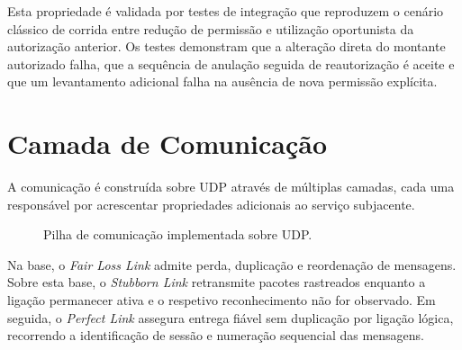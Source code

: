 \documentclass[runningheads]{llncs}
\begin{document}
Esta propriedade \'e validada por testes de integra\c{c}\~ao que reproduzem o cen\'ario cl\'assico de corrida entre redu\c{c}\~ao de permiss\~ao e utiliza\c{c}\~ao oportunista da autoriza\c{c}\~ao anterior. Os testes demonstram que a altera\c{c}\~ao direta do montante autorizado falha, que a sequ\^encia de anula\c{c}\~ao seguida de reautoriza\c{c}\~ao \'e aceite e que um levantamento adicional falha na aus\^encia de nova permiss\~ao expl\'icita.

\section{Camada de Comunica\c{c}\~ao}
\label{sec:camada-comunicacao}

A comunica\c{c}\~ao \'e constru\'ida sobre UDP atrav\'es de m\'ultiplas camadas, cada uma respons\'avel por acrescentar propriedades adicionais ao servi\c{c}o subjacente.

\begin{figure}[H]
\centering
{}
\caption{Pilha de comunica\c{c}\~ao implementada sobre UDP.}
\label{fig:communication-stack}
\end{figure}

Na base, o \textit{Fair Loss Link} admite perda, duplica\c{c}\~ao e reordena\c{c}\~ao de mensagens. Sobre esta base, o \textit{Stubborn Link} retransmite pacotes rastreados enquanto a liga\c{c}\~ao permanecer ativa e o respetivo reconhecimento n\~ao for observado. Em seguida, o \textit{Perfect Link} assegura entrega fi\'avel sem duplica\c{c}\~ao por liga\c{c}\~ao l\'ogica, recorrendo a identifica\c{c}\~ao de sess\~ao e numera\c{c}\~ao sequencial das mensagens.
\end{document}
